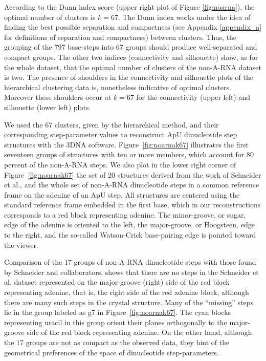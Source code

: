 According  to  the  Dunn  index  score (upper  right  plot  of  Figure
\ref{fig:noarna}), the optimal number  of clusters is $k=67$. The Dunn
index works under the idea of finding the best possible separation and
compactness   (see  Appendix   \ref{appendix_a}  for   definitions  of
separation and  compactness) between  clusters. Thus, the  grouping of
the 797  base-steps into 67  groups should produce  well-separated and
compact groups.   The other two indices  (connectivity and silhouette)
show, as for the whole dataset, that the optimal number of clusters of
the  non-A-RNA dataset  is  two.   The presence  of  shoulders in  the
connectivity and silhouette plots  of the hierarchical clustering data
is,  nonetheless  indicative  of  optimal  clusters.   Moreover  these
shoulders  occur  at $k=67$  for  the  connectivity  (upper left)  and
silhouette (lower left) plots.

We used the  67 clusters, given by the  hierarchical method, and their
corresponding  step-parameter values  to reconstruct  ApU dinucleotide
step  structures with  the 3DNA  software.  Figure~\ref{fig:noarnak67}
illustrates the first seventeen groups  of structures with ten or more
members, which account for 80 percent of the non-A-RNA steps.  We also
plot in  the lower right corner of  Figure~\ref{fig:noarnak67} the set
of   20   structures  derived   from   the   work   of  Schneider   et
al.\cite{schneider2004}, and  the whole set  of non-A-RNA dinucleotide
steps in a common reference frame  on the adenine of an ApU step.  All
structures are centered using the standard reference frame embedded in
the  first base,  which in  our reconstructions  corresponds to  a red
block representing  adenine.  The minor-groove, or sugar,  edge of the
adenine is oriented to the  left, the major-groove, or Hoogsteen, edge
to  the right,  and the  so-called Watson-Crick  base-pairing  edge is
pointed toward the viewer.

Comparison of the 17 groups of non-A-RNA dinucleotide steps with those
found by Schneider and collaborators, shows that there are no steps in
the Schneider  et al. dataset represented on  the major-groove (right)
side of the red block representing adenine, that is, the right side of
the  red adenine  block, although  there are  many such  steps  in the
crystal  structure. Many  of the  ``missing'' steps  lie in  the group
labeled  as   g7  in  Figure~\ref{fig:noarnak67}.    The  cyan  blocks
representing uracil in this  group orient their planes orthogonally to
the major-groove  side of the  red block representing adenine.  On the
other hand, although the 17 groups  are not as compact as the observed
data,  they  hint of  the  geometrical  preferences  of the  space  of
dinucleotide step-parameters.

